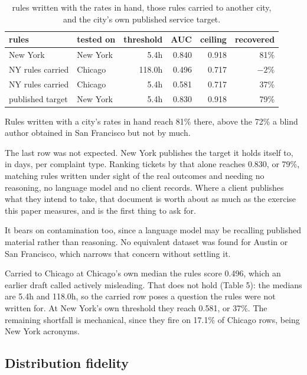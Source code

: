 \documentclass[10pt,a4paper,twocolumn]{article}
\begin{document}
\begin{table}[t]
\centering
\footnotesize
\begin{tabular}{llrrrr}
\toprule
rules & tested on & threshold & AUC & ceiling & recovered \\
\midrule
New York & New York & 5.4h & 0.840 & 0.918 & 81\% \\
NY rules carried & Chicago & 118.0h & 0.496 & 0.717 & $-2\%$ \\
NY rules carried & Chicago & 5.4h & 0.581 & 0.717 & 37\% \\
published target & New York & 5.4h & 0.830 & 0.918 & 79\% \\
\bottomrule
\end{tabular}
\caption{rules written with the rates in hand, those rules carried to another city, and the city's own published service target.}
\end{table}

Rules written with a city's rates in hand reach 81\% there, above the 72\% a blind
author obtained in San Francisco but not by much.

The last row was not expected. New York publishes the target it holds itself to,
in days, per complaint type. Ranking tickets by that alone reaches 0.830, or
79\%, matching rules written under sight of the real outcomes and needing no
reasoning, no language model and no client records. Where a client publishes
what they intend to take, that document is worth about as much as the exercise
this paper measures, and is the first thing to ask for.

It bears on contamination too, since a language model may be recalling published
material rather than reasoning. No equivalent dataset was found for Austin or
San Francisco, which narrows that concern without settling it.

Carried to Chicago at Chicago's own median the rules score 0.496, which an
earlier draft called actively misleading. That does not hold (Table 5): the
medians are 5.4h and 118.0h, so the carried row poses a question the rules were
not written for. At New York's own threshold they reach 0.581, or 37\%. The
remaining shortfall is mechanical, since they fire on 17.1\% of Chicago rows,
being New York acronyms.

\subsection*{Distribution fidelity}
\end{document}
